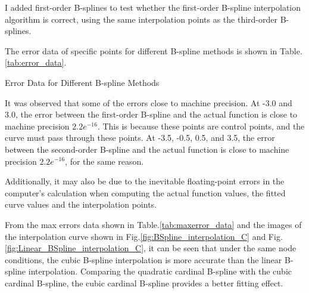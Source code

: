 \documentclass[a4paper]{article}
\begin{document}
\begin{sloppypar}
I added first-order B-splines to test whether the first-order B-spline
interpolation algorithm is correct, using the same interpolation points as the
third-order B-splines.

The error data of specific points for different B-spline methods is shown in
Table.\ref{tab:error_data}.

\begin{table}[H]
  \centering
  \renewcommand{\tablename}{Table.}
  \caption{Error Data for Different B-spline Methods}
  \label{tab:error_data}
\end{table}

It was observed that some of the errors close to machine precision. At -3.0 and
3.0, the error between the first-order B-spline and the actual function is
close to machine precision $2.2e^{-16}$. This is because these points are
control points, and the curve must pass through these points. At -3.5, -0.5,
0.5, and 3.5, the error between the second-order B-spline and the actual
function is close to machine precision $2.2e^{-16}$, for the same reason.

Additionally, it may also be due to the inevitable floating-point errors in the
computer's calculation when computing the actual function values, the fitted
curve values and the interpolation points.

From the max errors data shown in Table.\ref{tab:maxerror_data} and the images
of the interpolation curve shown in Fig.\ref{fig:BSpline_interpolation_C} and
Fig.\ref{fig:Linear_BSpline_interpolation_C}, it can be seen that under the
same node conditions, the cubic B-spline interpolation is more accurate than
the linear B-spline interpolation. Comparing the quadratic cardinal B-spline
with the cubic cardinal B-spline, the cubic cardinal B-spline provides a better
fitting effect.


\end{sloppypar}
\end{document}
